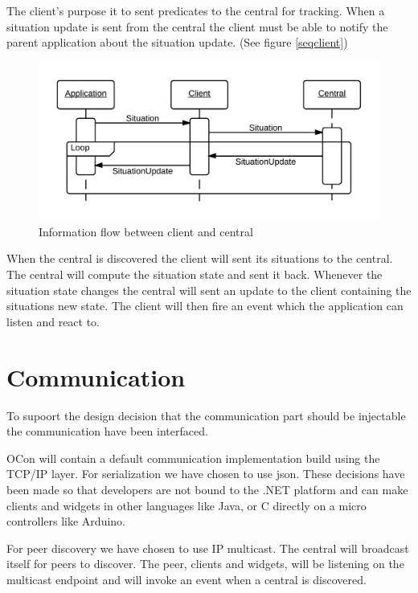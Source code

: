 \documentclass[../report.tex]{subfiles}
\begin{document}
The client's purpose it to sent predicates to the central for tracking. When a situation update is sent from the central the client must be able to notify the parent application about the situation update. (See figure \ref{seqclient})

\begin{figure}
\centering
\includegraphics[width=\linewidth]{clientsequencediagram.png}
\caption{Information flow between client and central}
\label{fig:seqclient}
\end{figure}

When the central is discovered the client will sent its situations to the central. The central will compute the situation state and sent it back. Whenever the situation state changes the central will sent an update to the client containing the situations new state. The client will then fire an event which the application can listen and react to.

\section{Communication}

To supoort the design decision that the communication part should be injectable the communication have been interfaced.

OCon will contain a default communication implementation build using the TCP/IP layer. For serialization we have chosen to use json. These decisions have been made so that developers are not bound to the .NET platform and can make clients and widgets in other languages like Java, or C directly on a micro controllers like Arduino.

For peer discovery we have chosen to use IP multicast. The central will broadcast itself for peers to discover. The peer, clients and widgets, will be listening on the multicast endpoint and will invoke an event when a central is discovered.
\end{document}
